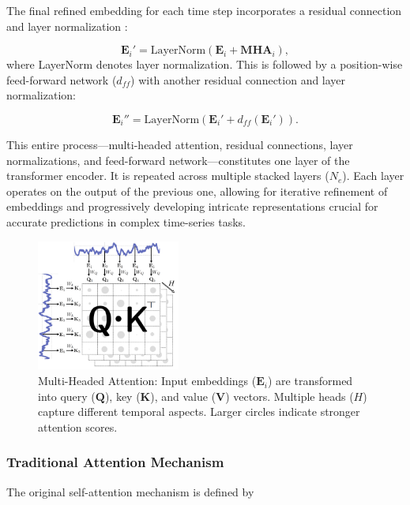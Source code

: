 \documentclass{ieeetmlcn}
\begin{document}
The final refined embedding for each time step incorporates a residual connection \cite{he2016deep} and layer normalization \cite{lei2016layer}:

\begin{equation}
    \mathbf{E}_i' = \text{LayerNorm}(\mathbf{E}_i + \mathbf{MHA}_i),
\end{equation}
where LayerNorm denotes layer normalization. This is followed by a position-wise feed-forward network ($d_{ff}$) with another residual connection and layer normalization:

\begin{equation}
    \mathbf{E}_i'' = \text{LayerNorm}(\mathbf{E}_i' + d_{ff}(\mathbf{E}_i')).
\end{equation}

This entire process—multi-headed attention, residual connections, layer normalizations, and feed-forward network—constitutes one layer of the transformer encoder. It is repeated across multiple stacked layers ($N_e$). Each layer operates on the output of the previous one, allowing for iterative refinement of embeddings and progressively developing intricate representations crucial for accurate predictions in complex time-series tasks.

\begin{figure}\centering
\centering
\includegraphics[width=0.42\textwidth]{img/attention_workings.pdf}
\caption{Multi-Headed Attention: Input embeddings ($\mathbf{E}_i$) are transformed into query ($\mathbf{Q}$), key ($\mathbf{K}$), and value ($\mathbf{V}$) vectors. Multiple heads ($H$) capture different temporal aspects. Larger circles indicate stronger attention scores.}
\label{fig:attention_workings}
\end{figure}

\subsubsection*{Traditional Attention Mechanism}

The original self-attention mechanism \cite{vaswani2017attention} is defined by
\end{document}
